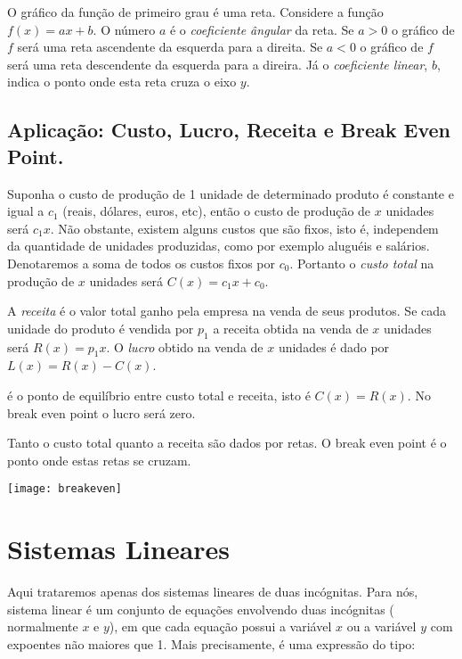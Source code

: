  O gráfico da função de primeiro grau é
uma reta. Considere a função $f(x)=ax+b$. O número $a$ é o {\it coeficiente ângular} da reta.
Se $a>0$ o gráfico de $f$ será uma reta
ascendente da esquerda para a direita. Se $a<0$ o gráfico de $f$ será uma reta descendente da esquerda para a direira.
Já o {\it coeficiente linear}, $b$, indica o ponto onde esta reta cruza o eixo $y$.

\subsection{Aplicação: Custo, Lucro, Receita e Break Even Point.}

Suponha o custo de produção de 1 unidade de determinado produto é constante e igual a $c_1$ (reais, dólares, euros, etc), então o custo de produção de $x$ unidades será $c_1x$. Não obstante, existem alguns custos que são fixos, isto é, independem
da quantidade de unidades produzidas, como por exemplo aluguéis e salários. Denotaremos a soma de todos os custos fixos por $c_0$. Portanto o {\it custo total} na produção de $x$ unidades
será  $C(x)=c_1x+c_0.$


A {\it receita} é o valor total ganho pela empresa na venda de seus produtos. Se cada unidade do produto é vendida por $p_1$
a receita obtida na venda de $x$ unidades será $R(x)=p_1x$. O {\it lucro} obtido na venda de $x$ unidades é dado por $L(x)=R(x)-C(x)$.

 é o ponto de equilíbrio entre custo total e receita, isto é $C(x)=R(x)$. No break even point o lucro será zero.

\vspace{0.5cm}

 Tanto o custo total quanto a receita são dados por retas. O break even point é o ponto onde estas retas se cruzam.


\begin{center}
\texttt{[image: breakeven]}
\end{center}


\section{Sistemas Lineares}

Aqui trataremos apenas dos sistemas lineares de duas incógnitas. Para nós, sistema linear é um conjunto de equações
envolvendo duas incógnitas ( normalmente $x$ e $y$), em que cada equação possui a variável $x$ ou a variável $y$
com expoentes não maiores que 1. Mais precisamente, é uma expressão do tipo:


